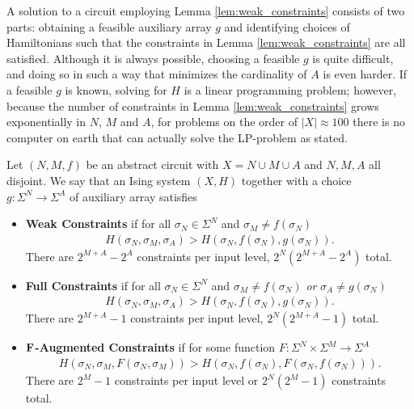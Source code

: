 \documentclass{article}
\begin{document}
A solution to a circuit employing Lemma \ref{lem:weak_constraints} consists of two parts: obtaining a feasible auxiliary array $g$ and identifying choices of Hamiltonians such that the constraints in Lemma \ref{lem:weak_constraints} are all satisfied. Although it is always possible, choosing a feasible $g$ is quite difficult, and doing so in such a way that minimizes the cardinality of $A$ is even harder. If a feasible $g$ is known, solving for $H$ is a linear programming problem; however, because the number of constraints in Lemma \ref{lem:weak_constraints} grows exponentially in $N$, $M$ and $A$, for problems on the order of $|X| \approx 100$ there is no computer on earth that can actually solve the LP-problem as stated.

\begin{defn}\label{defn:constraints}
  Let $(N,M,f)$ be an abstract circuit with $X = N \cup M \cup A$ and $N, M, A$ all disjoint. We say that an Ising system $(X, H)$ together with a choice $g: \Sigma^N\to \Sigma^A$ of auxiliary array satisfies
  \begin{itemize}
    \item \textbf{Weak Constraints} if for all $\sigma_N \in \Sigma^N$ and $\sigma_M \neq f(\sigma_N)$
      \begin{align*}
        H(\sigma_N, \sigma_M, \sigma_A) > H(\sigma_N, f(\sigma_N), g(\sigma_N)).
      \end{align*}
      There are $2^{M + A} - 2^A$ constraints per input level, $2^N(2^{M+A} - 2^A)$ total.
    \item \textbf{Full Constraints} if for all $\sigma_N \in \Sigma^N$ and $\sigma_M \neq f(\sigma_N)$ \emph{or} $\sigma_A \neq g(\sigma_N)$
      \begin{align*}
        H(\sigma_N, \sigma_M, \sigma_A) > H(\sigma_N, f(\sigma_N), g(\sigma_N)).
      \end{align*}
      There are $2^{M+A} - 1$ constraints per input level, $2^N(2^{M+A} - 1)$ total.
    \item \textbf{$\mathbf{F}$-Augmented Constraints} if for some function $F:\Sigma^{N} \times \Sigma^M \to \Sigma^A$
      \begin{align*}
        H(\sigma_N, \sigma_M, F(\sigma_N, \sigma_M)) > H(\sigma_N, f(\sigma_N), F(\sigma_N, f(\sigma_N))).
      \end{align*}
      There are $2^M - 1$ constraints per input level or $2^N(2^M - 1)$ constraints total.
  \end{itemize}
\end{defn}
\end{document}
